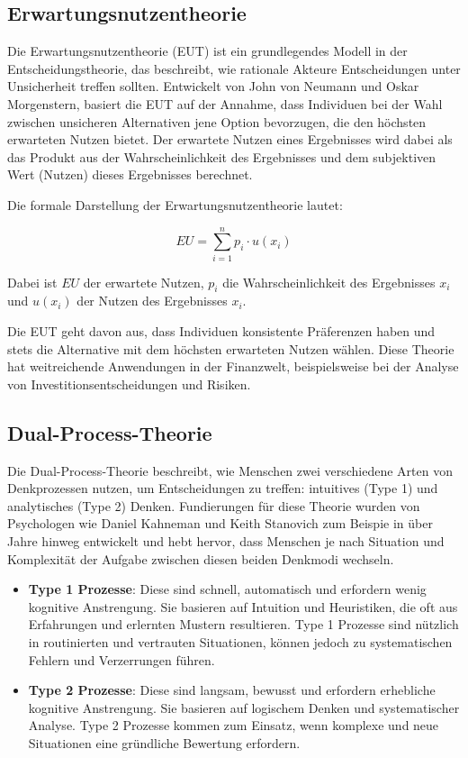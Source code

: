 \subsection{Erwartungsnutzentheorie}

Die Erwartungsnutzentheorie (\ac{EUT}) ist ein grundlegendes Modell in der Entscheidungstheorie, das beschreibt, wie rationale Akteure Entscheidungen unter Unsicherheit 
treffen sollten. Entwickelt von John von Neumann und Oskar Morgenstern, basiert die EUT auf der Annahme, dass Individuen bei der 
Wahl zwischen unsicheren Alternativen jene Option bevorzugen, die den höchsten erwarteten Nutzen bietet. Der erwartete Nutzen eines 
Ergebnisses wird dabei als das Produkt aus der Wahrscheinlichkeit des Ergebnisses und dem subjektiven Wert (Nutzen) dieses Ergebnisses 
berechnet.

Die formale Darstellung der Erwartungsnutzentheorie lautet:

\begin{equation}
EU = \sum_{i=1}^{n} p_i \cdot u(x_i)
\end{equation}

Dabei ist \( EU \) der erwartete Nutzen, \( p_i \) die Wahrscheinlichkeit des Ergebnisses \( x_i \) und \( u(x_i) \) der Nutzen des 
Ergebnisses \( x_i \).

Die EUT geht davon aus, dass Individuen konsistente Präferenzen haben und stets die Alternative mit dem höchsten erwarteten Nutzen 
wählen. \cite{vonNeumann1944} Diese Theorie hat weitreichende Anwendungen in der Finanzwelt, beispielsweise bei der Analyse von 
Investitionsentscheidungen und Risiken. 

\subsection{Dual-Process-Theorie}

Die Dual-Process-Theorie beschreibt, wie Menschen zwei verschiedene Arten von Denkprozessen nutzen, um Entscheidungen zu treffen: 
intuitives (Type 1) und analytisches (Type 2) Denken. Fundierungen für diese Theorie wurden von Psychologen wie Daniel Kahneman und Keith 
Stanovich zum Beispie in \cite{Tversky74} über Jahre hinweg entwickelt und hebt hervor, dass Menschen je nach Situation und 
Komplexität der Aufgabe zwischen diesen beiden Denkmodi wechseln.

\begin{itemize}
    \item \textbf{Type 1 Prozesse}: Diese sind schnell, automatisch und erfordern wenig kognitive Anstrengung. 
    Sie basieren auf Intuition und Heuristiken, die oft aus Erfahrungen und erlernten Mustern resultieren. 
    Type 1 Prozesse sind nützlich in routinierten und vertrauten Situationen, können jedoch zu systematischen 
    Fehlern und Verzerrungen führen.
    \item \textbf{Type 2 Prozesse}: Diese sind langsam, bewusst und erfordern erhebliche kognitive Anstrengung. 
    Sie basieren auf logischem Denken und systematischer Analyse. Type 2 Prozesse kommen zum Einsatz, wenn komplexe 
    und neue Situationen eine gründliche Bewertung erfordern.
\end{itemize}

